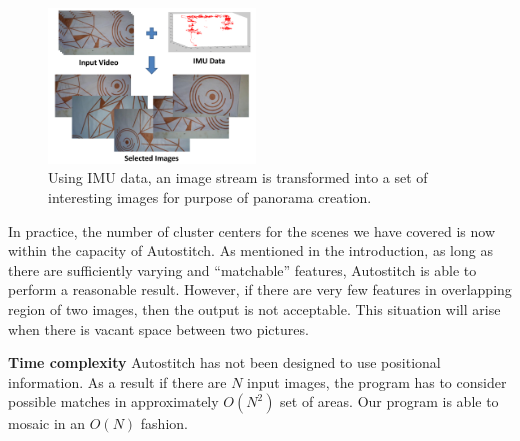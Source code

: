 \documentclass[10pt,twocolumn,letterpaper]{article}
\begin{document}
\begin{figure}[h!]
  \centering
  \includegraphics[width=0.49\textwidth]{figures/selection} 
  \caption{ \label{fig:selection} Using IMU data, an image stream is
    transformed into a set of interesting images for purpose of
    panorama creation. }
\end{figure}    

In practice, the number of cluster centers for the scenes we have
covered is now within the capacity of Autostitch.  As mentioned in the
introduction, as long as there are sufficiently varying and
``matchable'' features, Autostitch is able to perform a reasonable
result.  However, if there are very few features in overlapping region
of two images, then the output is not acceptable. This situation will
arise when there is vacant space between two pictures.

{\bf Time complexity} Autostitch has not been designed
to use positional information. As a result if there are $N$ input
images, the program has to consider possible matches in approximately
$O(N^2)$ set of areas.  Our program is able to mosaic in an $O(N)$
fashion.
\end{document}
